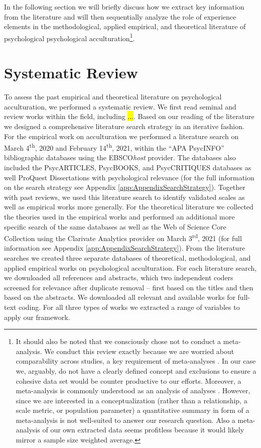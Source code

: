 \documentclass[man, 12pt, a4paper]{apa7}
\begin{document}
In the following section we will briefly discuss how we extract key information from the literature and will then sequentially analyze the role of experience elements in the methodological, applied empirical, and theoretical literature of psychological psychological acculturation\footnote{It should also be noted that we consciously chose not to conduct a meta-analysis. We conduct this review exactly because we are worried about comparability across studies, a key requirement of meta-analyses \citep{Pogue1998}. In our case we, arguably, do not have a clearly defined concept and exclusions to ensure a cohesive data set would be counter productive to our efforts. Moreover, a meta-analysis is commonly understood as an analysis of analyses \citep{Glass1976}. However, since we are interested in a conceptualization (rather than a relationship, a scale metric, or population parameter) a quantitative summary in form of a meta-analysis is not well-suited to answer our research question. Also a meta-analysis of our own extracted data seems profitless because it would likely mirror a sample size weighted average.}.

\section{Systematic Review}

To assess the past empirical and theoretical literature on psychological acculturation, we performed a systematic review. We first read seminal and review works within the field, including \hl{...}. Based on our reading of the literature we designed a comprehensive literature search strategy in an iterative fashion. For the empirical work on acculturation we performed a literature search on March 4\textsuperscript{th}, 2020 and February 14\textsuperscript{th}, 2021, within the ``APA PsycINFO'' bibliographic databases using the EBSCO\textit{host} provider. The databases also included the PsycARTICLES, PsycBOOKS, and PsycCRITIQUES databases as well ProQuest Dissertations with psychological relevance (for the full information on the search strategy see Appendix \ref{app:AppendixSearchStrategy}). 
Together with past reviews, we used this literature search to identify validated scales as well as empirical works more generally. For the theoretical literature we collected the theories used in the empirical works and performed an additional more specific search of the same databases as well as the Web of Science Core Collection using the Clarivate Analytics provider on March 3\textsuperscript{rd}, 2021 (for full information see Appendix \ref{app:AppendixSearchStrategy}). From the literature searches we created three separate databases of theoretical, methodological, and applied empirical works on psychological acculturation. For each literature search, we downloaded all references and abstracts, which two independent coders screened for relevance after duplicate removal -- first based on the titles and then based on the abstracts. We downloaded all relevant and available works for full-text coding. For all three types of works we extracted a range of variables to apply our framework.
\end{document}
